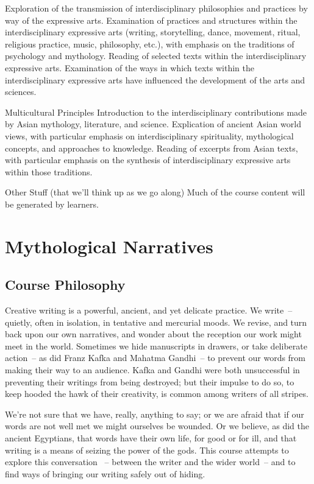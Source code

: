 \documentclass[10pt,DIV09,letterpaper,oneside,headsepline]{scrreprt}
\begin{document}
\begin{compactdesc}
Exploration of the transmission of interdisciplinary philosophies and practices by way of the expressive arts.
Examination of practices and structures within the interdisciplinary expressive arts (writing, storytelling, dance, movement, ritual, religious practice, music, philosophy, etc.), with emphasis on the traditions of psychology and mythology.
Reading of selected texts within the interdisciplinary expressive arts.
Examination of the ways in which texts within the interdisciplinary expressive arts have influenced the development of the arts and sciences.
\\
\item[Multicultural Principles]
Introduction to the interdisciplinary contributions made by Asian mythology, literature, and science.
Explication of ancient Asian world views, with particular emphasis on interdisciplinary spirituality, mythological concepts, and approaches to knowledge.
Reading of excerpts from Asian texts, with particular emphasis on the synthesis of interdisciplinary expressive arts within those traditions.
\\
\item[Other Stuff (that we'll think up as we go along)]
Much of the course content will be generated by learners.

\end{compactdesc}

\chapter{Mythological Narratives}

\section{Course Philosophy}
Creative writing is a powerful, ancient, and yet delicate practice. We write~-- quietly, often in isolation, in tentative and mercurial
moods. We revise, and turn back upon our own narratives, and wonder about the reception our work might meet in the world. Sometimes we hide manuscripts in
drawers, or take deliberate action~-- as did Franz Kafka and Mahatma Gandhi~-- to prevent our words from making their way to an audience. Kafka and Gandhi were both unsuccessful in preventing their writings from being destroyed; but their impulse to do so, to keep hooded the hawk of their creativity, is common among writers of all stripes.

We're not sure that we have, really, anything to say; or we are afraid that if our words are not well met we might ourselves be wounded. Or we believe, as did the ancient Egyptians, that words have their own life, for good or for ill, and that writing is a means of seizing the power of the gods. This course attempts to explore this conversation ~-- between the writer and the wider world~-- and to find ways of bringing our writing safely out of hiding.
\end{document}
